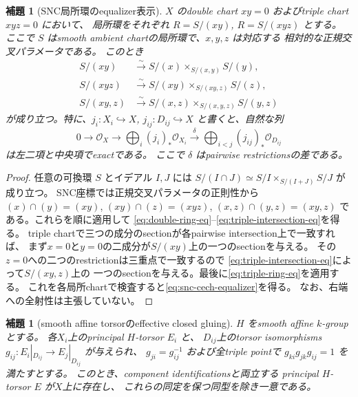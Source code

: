 \documentclass[uplatex,dvipdfmx,11pt]{jsarticle}
\numberwithin{equation}{section}
\theoremstyle{plain}
\newtheorem{lemma}[theorem]{補題}
\theoremstyle{definition}
\theoremstyle{remark}
\newcommand{\OO}{\mathcal O}
\begin{document}
\begin{lemma}[SNC局所環のequalizer表示]
\label{lem:snc-ring-equalizer}
$X$ のdouble chart $xy=0$ およびtriple chart $xyz=0$ において、
局所環をそれぞれ $R=S/(xy)$, $R=S/(xyz)$ とする。
ここで $S$ はsmooth ambient chartの局所環で、$x,y,z$ は対応する
相対的な正規交叉パラメータである。
このとき
\begin{align}
S/(xy)&\xrightarrow{\sim}
 S/(x)\times_{S/(x,y)}S/(y),\label{eq:double-ring-eq}\\
S/(xyz)&\xrightarrow{\sim}
 S/(xy)\times_{S/(xy,z)}S/(z),\label{eq:triple-ring-eq}\\
S/(xy,z)&\xrightarrow{\sim}
 S/(x,z)\times_{S/(x,y,z)}S/(y,z)\label{eq:triple-intersection-eq}
\end{align}
が成り立つ。特に、$j_i:X_i\hookrightarrow X$,
$j_{ij}:D_{ij}\hookrightarrow X$ と書くと、自然な列
\begin{equation}\label{eq:snc-cech-equalizer}
0\longrightarrow\OO_X\longrightarrow
\bigoplus_i(j_i)_*\OO_{X_i}\xrightarrow{\delta}
\bigoplus_{i<j}(j_{ij})_*\OO_{D_{ij}}
\end{equation}
は左二項と中央項でexactである。
ここで $\delta$ はpairwise restrictionsの差である。
\end{lemma}

\begin{proof}
任意の可換環 $S$ とイデアル $I,J$ には
$S/(I\cap J)\simeq S/I\times_{S/(I+J)}S/J$ が成り立つ。
SNC座標では正規交叉パラメータの正則性から
$(x)\cap(y)=(xy)$, $(xy)\cap(z)=(xyz)$,
$(x,z)\cap(y,z)=(xy,z)$ である。これらを順に適用して
\eqref{eq:double-ring-eq}--\eqref{eq:triple-intersection-eq}を得る。
triple chartで三つの成分のsectionが各pairwise intersection上で一致すれば、
まず$x=0$と$y=0$の二成分が$S/(xy)$上の一つのsectionを与える。
その$z=0$への二つのrestrictionは三重点で一致するので
\eqref{eq:triple-intersection-eq}によって$S/(xy,z)$上の
一つのsectionを与える。最後に\eqref{eq:triple-ring-eq}を適用する。
これを各局所chartで検査すると\eqref{eq:snc-cech-equalizer}を得る。
なお、右端への全射性は主張していない。
\end{proof}

\begin{lemma}[smooth affine torsorのeffective closed gluing]
\label{lem:snc-torsor-gluing}
$H$ をsmooth affine $k$-groupとする。
各$X_i$上のprincipal $H$-torsor $E_i$ と、
$D_{ij}$上のtorsor isomorphisms
$g_{ij}:E_i|_{D_{ij}}\to E_j|_{D_{ij}}$ が与えられ、
$g_{ji}=g_{ij}^{-1}$ および全triple pointで
$g_{ki}g_{jk}g_{ij}=1$ を満たすとする。
このとき、component identificationsと両立する
principal $H$-torsor $E$ が$X$上に存在し、
これらの同定を保つ同型を除き一意である。
\end{lemma}
\end{document}
